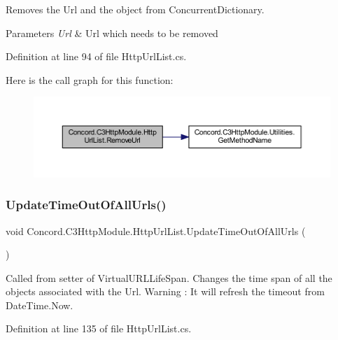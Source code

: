 Removes the Url and the object from Concurrent\+Dictionary. 


\begin{DoxyParams}{Parameters}
{\em Url} & Url which needs to be removed\\
\hline
\end{DoxyParams}


Definition at line 94 of file Http\+Url\+List.\+cs.

Here is the call graph for this function\+:
\nopagebreak
\begin{figure}[H]
\begin{center}
\leavevmode
\includegraphics[width=350pt]{class_concord_1_1_c3_http_module_1_1_http_url_list_acddaf4910903d915828c82b7c61f3fdc_cgraph}
\end{center}
\end{figure}
\mbox{\label{class_concord_1_1_c3_http_module_1_1_http_url_list_ac7cb0246fc6be60e897fc560bbf1fd13}} 
\subsubsection{\texorpdfstring{UpdateTimeOutOfAllUrls()}{UpdateTimeOutOfAllUrls()}}
{\footnotesize\ttfamily void Concord.\+C3\+Http\+Module.\+Http\+Url\+List.\+Update\+Time\+Out\+Of\+All\+Urls (\begin{DoxyParamCaption}{ }\end{DoxyParamCaption})\hspace{0.3cm}{\ttfamily [inline]}}



Called from setter of Virtual\+U\+R\+L\+Life\+Span. Changes the time span of all the objects associated with the Url. Warning \+: It will refresh the timeout from Date\+Time.\+Now. 



Definition at line 135 of file Http\+Url\+List.\+cs.

